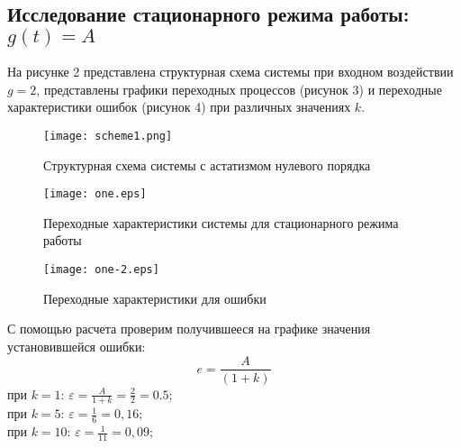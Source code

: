 \documentclass[a4paper,12pt]{article} %
\begin{document}
\subsection{Исследование стационарного режима работы: $g(t)=A$} 
На рисунке 2 представлена структурная схема системы при входном воздействии \\$g=2$, представлены графики переходных процессов (рисунок 3) и переходные характеристики ошибок (рисунок 4) при различных значениях $k$. 
\begin{figure}[h!]
	\centering
	\texttt{[image: scheme1.png]}
	\caption{Структурная схема системы с астатизмом нулевого порядка}
\end{figure}
\begin{figure}[H]
	\centering
	\texttt{[image: one.eps]}
	\caption{Переходные характеристики системы для стационарного режима работы}
\end{figure}
\begin{figure}[H]
	\centering
	\texttt{[image: one-2.eps]}
	\caption{Переходные характеристики для ошибки}
\end{figure}
\par С помощью расчета проверим получившееся на графике значения установившейся ошибки:
\begin{equation}
	e = \frac{A}{(1+k)}
\end{equation}
при $k=1$: $\varepsilon = \displaystyle{\frac{A}{1+k}}={\frac{2}{2}}=0.5;$\\
при $k=5$: $\varepsilon = \displaystyle{\frac{1}{6}}=0,16;$\\
при $k=10$: $\varepsilon = \displaystyle{\frac{1}{11}}=0,09;$\\

\newpage
\end{document}

